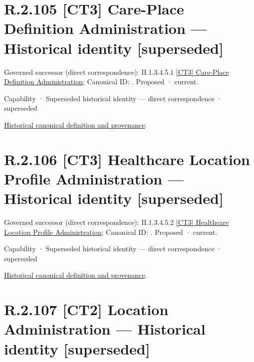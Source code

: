 \section*{R.2.105 [CT3] Care-Place Definition Administration — Historical identity [superseded]}
\label{navigation:R.2.105}

{\small Governed successor (direct correspondence): II.1.3.4.5.1 \hyperref[element:629b493c7d9844baa25c029a87ed04f6]{[CT3] Care-Place Definition Administration}; Canonical ID: \texttt{}. Proposed · current.}\par
\label{element:a3464bd9c0dc4a01b50803acc7705b4e}
{\small Capability · Superseded historical identity — direct correspondence · superseded}\par
\href{../../../../continuum/strategy/capability/a3464bd9c0dc4a01b50803acc7705b4e.md}{Historical canonical definition and provenance}.\par
\section*{R.2.106 [CT3] Healthcare Location Profile Administration — Historical identity [superseded]}
\label{navigation:R.2.106}

{\small Governed successor (direct correspondence): II.1.3.4.5.2 \hyperref[element:e579e54a08bb4f899a504aa998ba246b]{[CT3] Healthcare Location Profile Administration}; Canonical ID: \texttt{}. Proposed · current.}\par
\label{element:8a04d1f16d0849e786d2aaec33e0ba87}
{\small Capability · Superseded historical identity — direct correspondence · superseded}\par
\href{../../../../continuum/strategy/capability/8a04d1f16d0849e786d2aaec33e0ba87.md}{Historical canonical definition and provenance}.\par
\section*{R.2.107 [CT2] Location Administration — Historical identity [superseded]}
\label{navigation:R.2.107}

